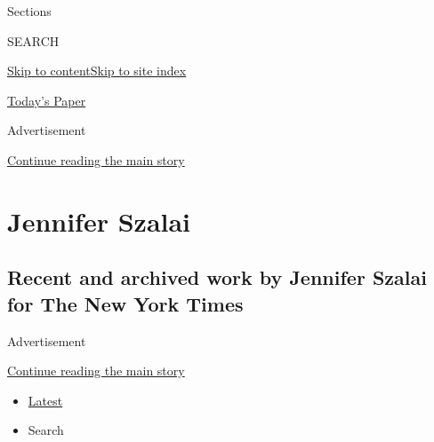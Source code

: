 Sections

SEARCH

\protect\hyperlink{site-content}{Skip to
content}\protect\hyperlink{site-index}{Skip to site index}

\href{https://myaccount.nytimes.com/auth/login?response_type=cookie\&client_id=vi}{}

\href{https://www.nytimes.com/section/todayspaper}{Today's Paper}

Advertisement

\protect\hyperlink{after-top}{Continue reading the main story}

\hypertarget{jennifer-szalai}{%
\section{Jennifer Szalai}\label{jennifer-szalai}}

\hypertarget{recent-and-archived-work-by-jennifer-szalai-for-the-new-york-times}{%
\subsection{Recent and archived work by Jennifer Szalai for The New York
Times}\label{recent-and-archived-work-by-jennifer-szalai-for-the-new-york-times}}

Advertisement

\protect\hyperlink{after-mid1}{Continue reading the main story}

\begin{itemize}
\tightlist
\item
  \protect\hyperlink{stream-panel}{Latest}
\item
  Search
\end{itemize}

